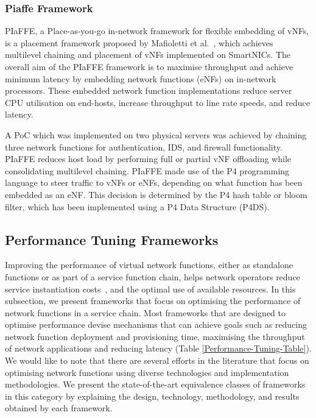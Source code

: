 \documentclass[futureinternet,review,accept,pdftex,moreauthors]{Definitions/mdpi}
\begin{document}
\subsubsection{Piaffe Framework}
\label{PIaFFE}
PIaFFE, a Place-as-you-go in-network framework for flexible embedding of vNFs, is a placement framework proposed by Mafioletti {et al.}~\cite{mafioletti2020piaffe}, which achieves multilevel chaining and placement of vNFs implemented on SmartNICs. The overall aim of the PIaFFE framework is to maximise throughput and achieve minimum latency by embedding network functions (eNFs) on in-network processors. These embedded network function implementations reduce server CPU utilisation on end-hosts, increase throughput to line rate speeds, and reduce latency.

A PoC which was implemented on two physical servers was achieved by chaining three network functions for authentication, IDS, and firewall functionality. PIaFFE reduces host load by performing full or partial vNF offloading while consolidating multilevel chaining. PIaFFE made use of the P4 programming language to steer traffic to vNFs or eNFs, depending on what function has been embedded as an eNF. This decision is determined by the P4 hash table or bloom filter, which has been implemented using a P4 Data Structure (P4DS).



\subsection{Performance Tuning Frameworks}
\label{Performance tuning frameworks}
Improving the performance of virtual network functions, either as standalone functions or as part of a service function chain, helps network operators reduce service instantiation costs~\cite{katsikas2021metron}, and the optimal use of available resources. In this subsection, we present frameworks that focus on optimising the performance of network functions in a service chain. Most frameworks that are designed to optimise performance devise mechanisms that can achieve goals such as reducing network function deployment and provisioning time, maximising the throughput of network applications and reducing latency (Table \ref{Performance-Tuning-Table}). We would like to note that there are several efforts in the literature that focus on optimising network functions using diverse technologies and implementation methodologies. We present the state-of-the-art equivalence classes of frameworks in this category by explaining the design, technology, methodology, and results obtained by each framework.
\end{document}
